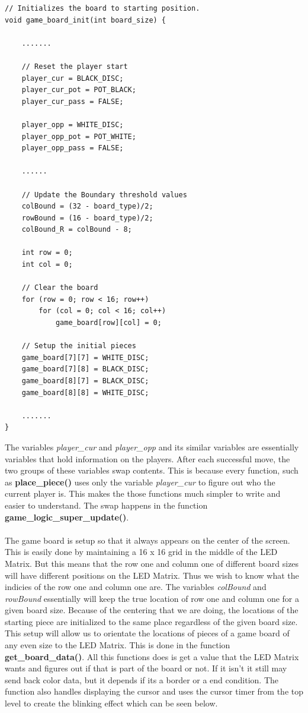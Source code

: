 \documentclass[a4paper, 12pt]{article}
\begin{document}
    \begin{verbatim}
// Initializes the board to starting position.
void game_board_init(int board_size) {
    
    .......

    // Reset the player start
    player_cur = BLACK_DISC;
    player_cur_pot = POT_BLACK;
    player_cur_pass = FALSE;
    
    player_opp = WHITE_DISC;
    player_opp_pot = POT_WHITE;
    player_opp_pass = FALSE;
    
    ......
    
    // Update the Boundary threshold values
    colBound = (32 - board_type)/2;
    rowBound = (16 - board_type)/2;
    colBound_R = colBound - 8;
    
    int row = 0;
    int col = 0;
    
    // Clear the board
    for (row = 0; row < 16; row++)
        for (col = 0; col < 16; col++)
            game_board[row][col] = 0;
    
    // Setup the initial pieces
    game_board[7][7] = WHITE_DISC;
    game_board[7][8] = BLACK_DISC;
    game_board[8][7] = BLACK_DISC;
    game_board[8][8] = WHITE_DISC;

    .......
}
    \end{verbatim}

    The variables \textit{player\_cur} and \textit{player\_opp} and its similar
    variables are essentially variables that hold information on the players.
    After each successful move, the two groups of these variables swap contents.
    This is because every function, such as \textbf{place\_piece()} uses only
    the variable \textit{player\_cur} to figure out who the current player is.
    This makes the those functions much simpler to write and easier to understand.
    The swap happens in the function \textbf{game\_logic\_super\_update()}.
    \\ \\
    The game board is setup so that it always appears on the center of the screen.
    This is easily done by maintaining a 16 x 16 grid in the middle of the LED
    Matrix. But this means that the row one and column one of different board sizes will 
    have different positions on the LED Matrix. Thus we wish to know
    what the indicies of the row one and column one are. The variables
    \textit{colBound} and \textit{rowBound} essentially will keep the true
    location of row one and column one for a given board size. Because of the
    centering that we are doing, the locations of the starting piece are 
    initialized to the same place regardless of the given board size.
    This setup will allow us to orientate the locations of pieces of a game 
    board of any even size to the LED Matrix. This is done in the function 
    \textbf{get\_board\_data()}. All this functions does is get a value that
    the LED Matrix wants and figures out if that is part of the board or not.
    If it isn't it still may send back color data, but it depends if its a
    border or a end condition. The function also handles displaying the
    cursor and uses the cursor timer from the top level to create the
    blinking effect which can be seen below.
\end{document}
